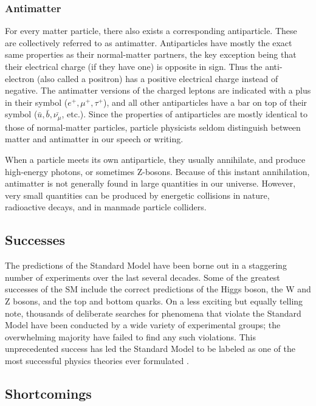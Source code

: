 \subsubsection*{Antimatter}
For every matter particle, there also exists a corresponding
antiparticle. These are collectively referred to as
antimatter. Antiparticles have mostly the exact same properties as
their normal-matter partners, the key exception being that their electrical charge (if
they have one) is opposite in sign. Thus the anti-electron (also
called a positron) has a positive electrical charge instead of
negative. The antimatter versions of the charged leptons are indicated
with a plus in their symbol ($e^+, \mu^+, \tau^+$), and all other
antiparticles have a bar on top of their symbol ($\bar{u},
\bar{b}, \bar{\nu_{\mu}}$, etc.). Since the properties of
antiparticles are mostly identical to those of normal-matter
particles, particle physicists seldom distinguish between matter and
antimatter in our speech or writing.

When a particle meets its own antiparticle, they usually annihilate,
and produce high-energy photons, or sometimes Z-bosons. Because of this
instant annihilation, antimatter is not generally found
in large quantities in our universe. However, very small quantities can be
produced by energetic collisions in nature, radioactive decays, and in manmade
particle colliders.

\subsection{Successes}
\label{ssec:SMsuccesses}

The predictions of the Standard Model have been borne out in a
staggering number of experiments over the last several decades.
Some of the greatest successes of the SM
include the correct predictions of the Higgs boson, the W and Z
bosons, and the top and bottom quarks. On a less exciting but equally
telling note, thousands of deliberate searches for phenomena that
violate the Standard Model have been conducted by a wide variety of
experimental groups; the overwhelming majority have failed to find
any such violations. This unprecedented success has led the
Standard Model to be labeled as one of the most successful
physics theories ever formulated \cite{griffiths,smcoffee}.

\subsection{Shortcomings}
\label{ssec:SMshortcomings}

